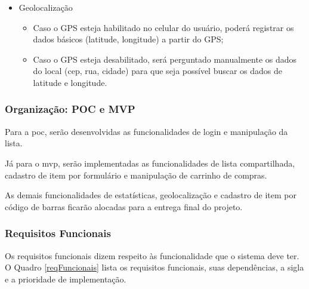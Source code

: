 \begin{itemize}
	\item Geolocalização
		\begin{itemize}
			\item Caso o GPS esteja habilitado no celular do usuário, poderá registrar os dados básicos (latitude, longitude) a partir do GPS;
			\item Caso o GPS esteja desabilitado, será perguntado manualmente os dados do local (cep, rua, cidade) para que seja possível buscar os dados de latitude e longitude.
		\end{itemize}
\end{itemize}

\subsubsection{Organização: POC e MVP}

Para a \gls{poc}, serão desenvolvidas as funcionalidades de login e manipulação da lista.

Já para o \gls{mvp}, serão implementadas as funcionalidades de lista compartilhada, cadastro de item por formulário e manipulação de carrinho de compras. 

As demais funcionalidades de estatísticas, geolocalização e cadastro de item por código de barras ficarão alocadas para a entrega final do projeto.

\subsubsection{Requisitos Funcionais}

Os requisitos funcionais dizem respeito às funcionalidade que o sistema deve ter. O Quadro \ref{reqFuncionais} lista os requisitos funcionais, suas dependências, a sigla e a prioridade de implementação.

